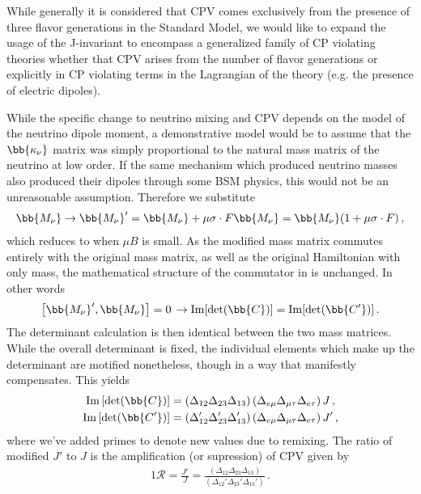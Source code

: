 While generally it is considered that CPV comes exclusively from the presence of three flavor generations in the Standard Model, we would like to expand the usage of the J-invariant to encompass a generalized family of CP violating theories whether that CPV arises from the number of flavor generations or explicitly in CP violating terms in the Lagrangian of the theory (e.g. the presence of electric dipoles).

While the specific change to neutrino mixing and CPV depends on the model of the neutrino dipole moment, a demonstrative model would be to assume that the $\bb{\kappa_{\nu}}$ matrix was simply proportional to the natural mass matrix of the neutrino at low order. If the same mechanism which produced neutrino masses also produced their dipoles through some BSM physics, this would not be an unreasonable assumption. Therefore we substitute
\begin{alignat}{1}
	\label{simplek:1} \bb{M_{\nu}}\rightarrow\bb{M_{\nu}}'=\bb{M_{\nu}}+\mu\sigma\cdot F\bb{M_{\nu}}=\bb{M_{\nu}}(1+\mu\sigma\cdot F)\,,
\end{alignat}
which reduces to  when $\mu B$ is small. As the modified mass matrix commutes entirely with the original mass matrix, as well as the original Hamiltonian with only mass, the mathematical structure of the commutator in  is unchanged. In other words
\begin{alignat}{1}
	\label{commutes:1} \left[\bb{M_{\nu}}',\bb{M_{\nu}}\right]=0\, \rightarrow \mathrm{Im}[\mathrm{det}(\bb{C})] = \mathrm{Im}[\mathrm{det}(\bb{C'})]\,.
\end{alignat}
The determinant calculation is then identical between the two mass matrices. While the overall determinant is fixed, the individual elements which make up the determinant are motified nonetheless, though in a way that manifestly compensates. This yields
\begin{alignat}{1}
	\label{det:0} \mathrm{Im}\left[\mathrm{det}(\bb{C})\right] &= \left(\Delta_{12}\Delta_{23}\Delta_{13}\right)\left(\Delta_{e\mu}\Delta_{\mu\tau}\Delta_{e\tau}\right)J\,,\\
	\label{det:1} \mathrm{Im}\left[\mathrm{det}(\bb{C'})\right] &= \left(\Delta_{12}'\Delta_{23}'\Delta_{13}'\right)\left(\Delta_{e\mu}\Delta_{\mu\tau}\Delta_{e\tau}\right)J'\,,
\end{alignat}
where we've added primes to denote new values due to remixing. The ratio of modified $J'$ to $J$ is the amplification (or supression) of CPV \ar given by
\begin{alignat}{1}
	\label{amp:1} \mathcal{R} = \frac{J'}{J} = \frac{\left(\Delta_{12}\Delta_{23}\Delta_{13}\right)}{\left(\Delta_{12}'\Delta_{23}'\Delta_{13}'\right)}\,.
\end{alignat}
